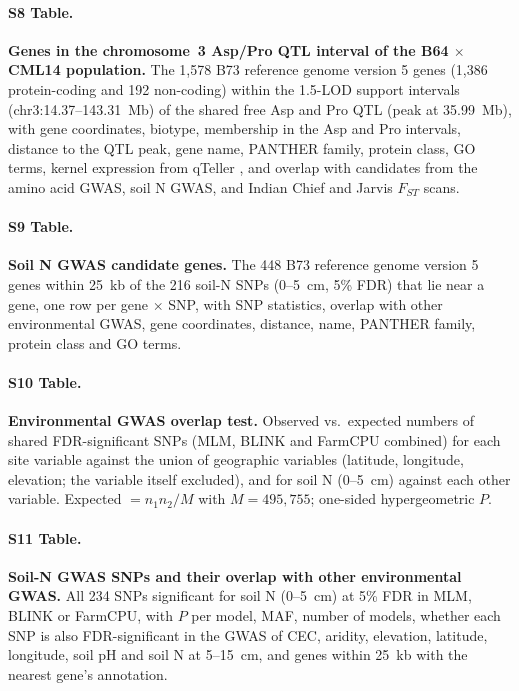 \paragraph*{S8 Table.}
\makeatletter
\def\@currentlabelname{S8 Table}
\makeatother
\label{S8_Table}
\textbf{Genes in the chromosome~3 Asp/Pro QTL interval of the B64 $\times$ CML14 population.} The 1,578 B73 reference genome version 5 genes (1,386 protein-coding and 192 non-coding) within the 1.5-LOD support intervals (chr3:14.37--143.31~Mb) of the shared free Asp and Pro QTL (peak at 35.99~Mb), with gene coordinates, biotype, membership in the Asp and Pro intervals, distance to the QTL peak, gene name, PANTHER family, protein class, GO terms, kernel expression from qTeller \citep{qteller}, and overlap with candidates from the amino acid GWAS, soil N GWAS, and Indian Chief and Jarvis $F_{ST}$ scans.

\paragraph*{S9 Table.}
\makeatletter
\def\@currentlabelname{S9 Table}
\makeatother
\label{S9_Table}
\textbf{Soil N GWAS candidate genes.} The 448 B73 reference genome version 5 genes within 25~kb of the 216 soil-N SNPs (0--5~cm, 5\% FDR) that lie near a gene, one row per gene $\times$ SNP, with SNP statistics, overlap with other environmental GWAS, gene coordinates, distance, name, PANTHER family, protein class and GO terms.

\paragraph*{S10 Table.}
\makeatletter
\def\@currentlabelname{S10 Table}
\makeatother
\label{S10_Table}
\textbf{Environmental GWAS overlap test.} Observed vs.\ expected numbers of shared FDR-significant SNPs (MLM, BLINK and FarmCPU combined) for each site variable against the union of geographic variables (latitude, longitude, elevation; the variable itself excluded), and for soil N (0--5~cm) against each other variable. Expected $= n_1 n_2 / M$ with $M = 495{,}755$; one-sided hypergeometric $P$.

\paragraph*{S11 Table.}
\makeatletter
\def\@currentlabelname{S11 Table}
\makeatother
\label{S11_Table}
\textbf{Soil-N GWAS SNPs and their overlap with other environmental GWAS.} All 234 SNPs significant for soil N (0--5~cm) at 5\% FDR in MLM, BLINK or FarmCPU, with $P$ per model, MAF, number of models, whether each SNP is also FDR-significant in the GWAS of CEC, aridity, elevation, latitude, longitude, soil pH and soil N at 5--15~cm, and genes within 25~kb with the nearest gene's annotation.

